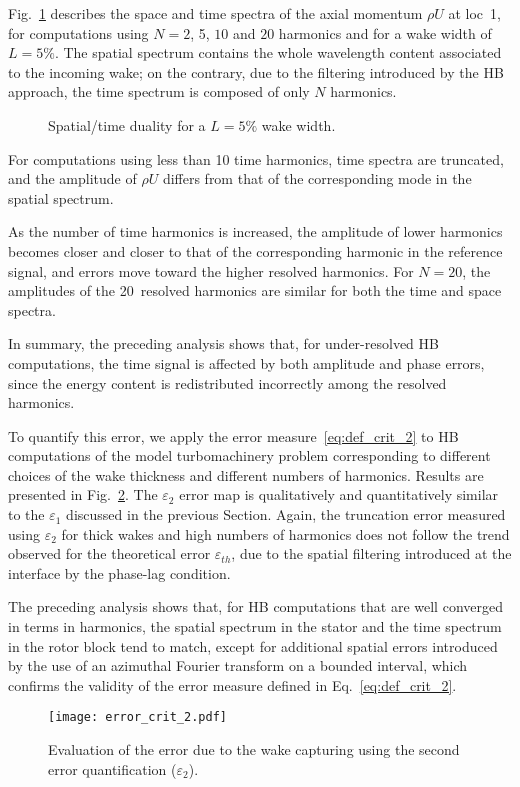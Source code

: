 Fig.~\ref{fig:dualite_crit} describes the space and 
time spectra of the axial momentum $\rho U$ at loc~1, 
for computations using $N=2$, 5, $10$ and $20$ 
harmonics and for a wake width of $L=5\%$.
The spatial spectrum contains the whole wavelength 
content associated to the incoming wake; 
on the contrary, due to the filtering introduced 
by the HB approach, the time spectrum is composed of only $N$ harmonics.
\begin{figure}[htp]
\centering
{}
\caption{Spatial/time duality for a $L=5\%$ wake width.}
\label{fig:dualite_crit}
\end{figure}

For computations using less than 10 time harmonics, 
time spectra are truncated, and the amplitude of 
$\rho U$ differs from that of the corresponding mode in the spatial spectrum.

As the number of time harmonics is increased, 
the amplitude of lower harmonics becomes closer 
and closer to that of the corresponding harmonic 
in the reference signal, and errors move toward 
the higher resolved harmonics. For $N=20$, 
the amplitudes of the 20~resolved harmonics are 
similar for both the time and space spectra.

In summary, the preceding analysis shows that, 
for under-resolved HB computations, the time 
signal is affected by both amplitude and phase errors, 
since the energy content is redistributed incorrectly 
among the resolved harmonics.

To quantify this error, we apply the error measure~\eqref{eq:def_crit_2}
to HB computations of the model turbomachinery 
problem corresponding to different choices 
of the wake thickness and different numbers of 
harmonics. Results are presented in Fig.~\ref{fig:crit_2_3d}.
The $\varepsilon_2$ error map is qualitatively 
and quantitatively similar to the $\varepsilon_1$ 
discussed in the previous Section. 
Again, the truncation error measured using $\varepsilon_2$ 
for thick wakes and high numbers of harmonics 
does not follow the trend observed for the 
theoretical error $\varepsilon_{th}$, 
due to the spatial filtering introduced at the 
interface by the phase-lag condition.

The preceding analysis shows that, for HB computations 
that are well converged in terms in harmonics, 
the spatial spectrum in the stator and the 
time spectrum in the rotor block tend to match, 
except for additional spatial errors introduced
by the use of an azimuthal Fourier transform on a 
bounded interval, which confirms the 
validity of the error measure defined in Eq.~\eqref{eq:def_crit_2}.
\begin{figure}[htp]
   \centering \texttt{[image: error\_crit\_2.pdf]}
  \caption{Evaluation of the error due to the wake 
  capturing using the second error quantification ($\varepsilon_2$).}
  \label{fig:crit_2_3d}
\end{figure}

